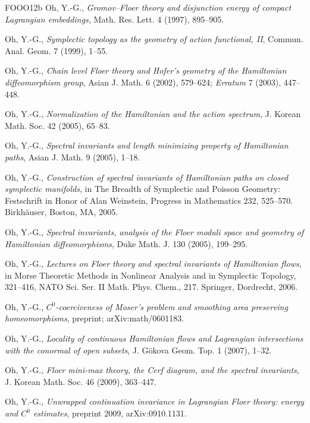 \begin{thebibliography}{FOOO12b}
 Oh, Y.-G., \emph{Gromov–Floer theory and disjunction energy of compact Lagrangian
  embeddings,} Math. Res. Lett. 4 (1997), 895–905.

 Oh, Y.-G., \emph{Symplectic topology as the geometry of action functional, II},
  Commun. Anal. Geom. 7 (1999), 1–55.

 Oh, Y.-G., \emph{Chain level Floer theory and Hofer’s geometry of the Hamiltonian
  diﬀeomorphism group}, Asian J. Math. 6 (2002), 579–624; \emph{Erratum} 7 (2003), 447–448.

 Oh, Y.-G., \emph{Normalization of the Hamiltonian and the action spectrum}, J.
  Korean Math. Soc. 42 (2005), 65–83.

 Oh, Y.-G., \emph{Spectral invariants and length minimizing property of
  Hamil\-tonian paths}, Asian J. Math. 9 (2005), 1–18.

 Oh, Y.-G., \emph{Construction of spectral invariants of Hamiltonian paths on
  closed symplectic manifolds}, in The Breadth of Symplectic and Pois\-son Geometry: Festschrift in Honor
  of Alan Weinstein, Progress in Mathematics 232, 525–570. Birkhäuser, Boston, MA, 2005.

 Oh, Y.-G., \emph{Spectral invariants, analysis of the Floer moduli space and
  geometry of Hamiltonian diﬀeomorphisms}, Duke Math. J. 130 (2005), 199–295.

 Oh, Y.-G., \emph{Lectures on Floer theory and spectral invariants of Hamil\-tonian
  flows}, in Morse Theoretic Methods in Nonlinear Analysis and in Symplectic Topology, 321–416, NATO Sci.
  Ser. II Math. Phys. Chem., 217. Springer, Dordrecht, 2006.

 Oh, Y.-G., \emph{$C^0$-coerciveness of Moser’s problem and smoothing area
  preserving homeomorphisms}, preprint; arXiv:math/0601183.

 Oh, Y.-G., \emph{Locality of continuous Hamiltonian flows and Lagrangian
  intersections with the conormal of open subsets}, J. Gökova Geom. Top. 1 (2007), 1–32.

 Oh, Y.-G., \emph{Floer mini-max theory, the Cerf diagram, and the spectral
  invariants}, J. Korean Math. Soc. 46 (2009), 363–447.

 Oh, Y.-G., \emph{Unwrapped continuation invariance in Lagrangian Floer theory:
  energy and $C^0$ estimates}, preprint 2009, arXiv:0910.1131.


\end{thebibliography}
